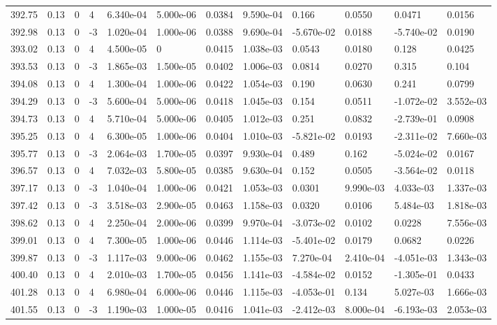 \documentclass[preview]{standalone}
\begin{document}
{{{{{{{{{{{{{{{{{{\begin{tabular}{L{1.2cm}C{1.2cm} C{0.3cm}C{0.5cm} C{1.4cm}C{1.4cm} C{1.4cm}C{1.4cm} C{1.6cm}C{1.6cm} C{1.6cm}C{1.6cm}}
  392.75  &  0.13  & 0     &  4 &  6.340e-04  & 5.000e-06  &  0.0384&   9.590e-04& 0.166 & 0.0550   &  0.0471 & 0.0156  \\ 
  392.98  &  0.13  & 0     & -3 &  1.020e-04  & 1.000e-06  &  0.0388&   9.690e-04& -5.670e-02 & 0.0188   &  -5.740e-02 & 0.0190  \\ 
  393.02  &  0.13  & 0     &  4 &  4.500e-05  & 0  &  0.0415&   1.038e-03& 0.0543 & 0.0180   &  0.128 & 0.0425  \\ 
  393.53  &  0.13  & 0     & -3 &  1.865e-03  & 1.500e-05  &  0.0402&   1.006e-03& 0.0814 & 0.0270   &  0.315 & 0.104  \\ 
  394.08  &  0.13  & 0     &  4 &  1.300e-04  & 1.000e-06  &  0.0422&   1.054e-03& 0.190 & 0.0630   &  0.241 & 0.0799  \\ 
  394.29  &  0.13  & 0     & -3 &  5.600e-04  & 5.000e-06  &  0.0418&   1.045e-03& 0.154 & 0.0511   &  -1.072e-02 & 3.552e-03  \\ 
  394.73  &  0.13  & 0     &  4 &  5.710e-04  & 5.000e-06  &  0.0405&   1.012e-03& 0.251 & 0.0832   &  -2.739e-01 & 0.0908  \\ 
  395.25  &  0.13  & 0     &  4 &  6.300e-05  & 1.000e-06  &  0.0404&   1.010e-03& -5.821e-02 & 0.0193   &  -2.311e-02 & 7.660e-03  \\ 
  395.77  &  0.13  & 0     & -3 &  2.064e-03  & 1.700e-05  &  0.0397&   9.930e-04& 0.489 & 0.162   &  -5.024e-02 & 0.0167  \\ 
  396.57  &  0.13  & 0     &  4 &  7.032e-03  & 5.800e-05  &  0.0385&   9.630e-04& 0.152 & 0.0505   &  -3.564e-02 & 0.0118  \\ 
  397.17  &  0.13  & 0     & -3 &  1.040e-04  & 1.000e-06  &  0.0421&   1.053e-03& 0.0301 & 9.990e-03   &  4.033e-03 & 1.337e-03  \\ 
  397.42  &  0.13  & 0     & -3 &  3.518e-03  & 2.900e-05  &  0.0463&   1.158e-03& 0.0320 & 0.0106   &  5.484e-03 & 1.818e-03  \\ 
  398.62  &  0.13  & 0     &  4 &  2.250e-04  & 2.000e-06  &  0.0399&   9.970e-04& -3.073e-02 & 0.0102   &  0.0228 & 7.556e-03  \\ 
  399.01  &  0.13  & 0     &  4 &  7.300e-05  & 1.000e-06  &  0.0446&   1.114e-03& -5.401e-02 & 0.0179   &  0.0682 & 0.0226  \\ 
  399.87  &  0.13  & 0     & -3 &  1.117e-03  & 9.000e-06  &  0.0462&   1.155e-03& 7.270e-04 & 2.410e-04   &  -4.051e-03 & 1.343e-03  \\ 
  400.40  &  0.13  & 0     &  4 &  2.010e-03  & 1.700e-05  &  0.0456&   1.141e-03& -4.584e-02 & 0.0152   &  -1.305e-01 & 0.0433  \\ 
  401.28  &  0.13  & 0     &  4 &  6.980e-04  & 6.000e-06  &  0.0446&   1.115e-03& -4.053e-01 & 0.134   &  5.027e-03 & 1.666e-03  \\ 
  401.55  &  0.13  & 0     & -3 &  1.190e-03  & 1.000e-05  &  0.0416&   1.041e-03& -2.412e-03 & 8.000e-04   &  -6.193e-03 & 2.053e-03  \\ 
\hline 
\end{tabular} 

}}}}}}}}}}}}}}}}}}
\end{document}
